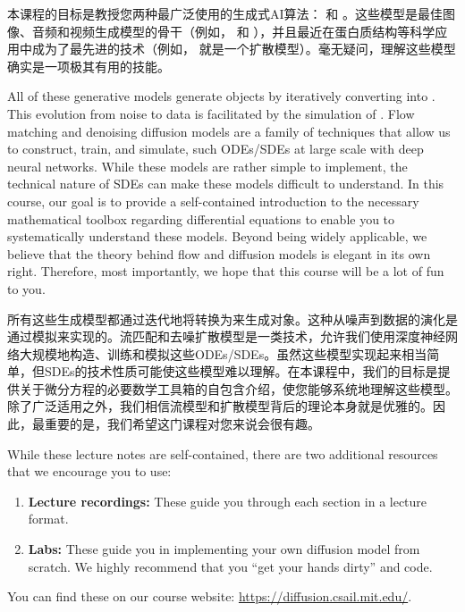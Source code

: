 本课程的目标是教授您两种最广泛使用的生成式AI算法： \citep{song2020score} 和  \citep{lipman2022flow,liu2022flow, albergo2023stochastic, lipman2024flow}。这些模型是最佳图像、音频和视频生成模型的骨干（例如， 和 ），并且最近在蛋白质结构等科学应用中成为了最先进的技术（例如， 就是一个扩散模型）。毫无疑问，理解这些模型确实是一项极其有用的技能。

All of these generative models generate objects by iteratively converting   into . This evolution from noise to data is facilitated by the simulation of . Flow matching and denoising diffusion models are a family of techniques that allow us to construct, train, and simulate, such ODEs/SDEs at large scale with deep neural networks. While these models are rather simple to implement, the technical nature of SDEs can make these models difficult to understand. In this course, our goal is to provide a self-contained introduction to the necessary mathematical toolbox regarding differential equations to enable you to systematically understand these models. Beyond being widely applicable, we believe that the theory behind flow and diffusion models is elegant in its own right. Therefore, most importantly, we hope that this course will be a lot of fun to you.

所有这些生成模型都通过迭代地将转换为来生成对象。这种从噪声到数据的演化是通过模拟来实现的。流匹配和去噪扩散模型是一类技术，允许我们使用深度神经网络大规模地构造、训练和模拟这些ODEs/SDEs。虽然这些模型实现起来相当简单，但SDEs的技术性质可能使这些模型难以理解。在本课程中，我们的目标是提供关于微分方程的必要数学工具箱的自包含介绍，使您能够系统地理解这些模型。除了广泛适用之外，我们相信流模型和扩散模型背后的理论本身就是优雅的。因此，最重要的是，我们希望这门课程对您来说会很有趣。 

\begin{remarkbox} 
While these lecture notes are self-contained, there are two additional resources that we encourage you to use:
\begin{enumerate}
    \item \textbf{Lecture recordings:} These guide you through each section in a lecture format.
    \item \textbf{Labs:} These guide you in implementing your own diffusion model from scratch. We highly recommend that you ``get your hands dirty'' and code.
\end{enumerate}
You can find these on our course website: \url{https://diffusion.csail.mit.edu/}.
\end{remarkbox}

